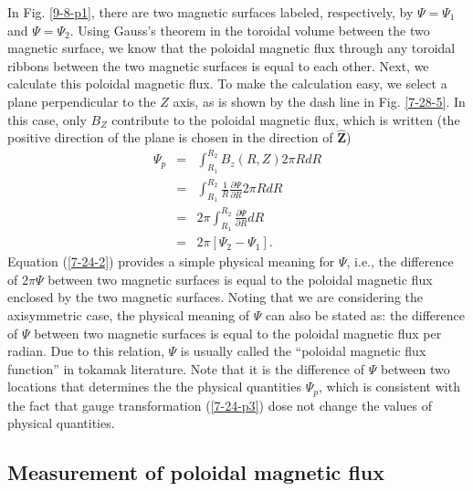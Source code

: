 \documentclass{llncs}
\begin{document}
In Fig. \ref{9-8-p1}, there are two magnetic surfaces labeled, respectively,
by $\Psi = \Psi_1$ and $\Psi = \Psi_2$. Using Gauss's theorem in the toroidal
volume between the two magnetic surface, we know that the poloidal magnetic
flux through any toroidal ribbons between the two magnetic surfaces is equal
to each other. Next, we calculate this poloidal magnetic flux. To make the
calculation easy, we select a plane perpendicular to the $Z$ axis, as is shown
by the dash line in Fig. \ref{7-28-5}. In this case, only $B_Z$ contribute to
the poloidal magnetic flux, which is written (the positive direction of the
plane is chosen in the direction of $\hat{\mathbf{Z}}$)
\begin{eqnarray}
  \Psi_p & = & \int_{R_1}^{R_2} B_z (R, Z) 2 \pi R d R \nonumber\\
  & = & \int_{R_1}^{R_2} \frac{1}{R}  \frac{\partial \Psi}{\partial R} 2 \pi
  R d R \nonumber\\
  & = & 2 \pi \int^{R_2}_{R_1} \frac{\partial \Psi}{\partial R} d R
  \nonumber\\
  & = & 2 \pi [\Psi_2 - \Psi_1] .  \label{7-24-2}
\end{eqnarray}
Equation (\ref{7-24-2}) provides a simple physical meaning for $\Psi$, i.e.,
the difference of $2 \pi \Psi$ between two magnetic surfaces is equal to the
poloidal magnetic flux enclosed by the two magnetic surfaces. Noting that we
are considering the axisymmetric case, the physical meaning of $\Psi$ can also
be stated as: the difference of $\Psi$ between two magnetic surfaces is equal
to the poloidal magnetic flux per radian. Due to this relation, $\Psi$ is
usually called the ``poloidal magnetic flux function'' in tokamak literature.
Note that it is the difference of $\Psi$ between two locations that determines
the the physical quantities $\Psi_p$, which is consistent with the fact that
gauge transformation (\ref{7-24-p3}) dose not change the values of physical
quantities.

\subsection{Measurement of poloidal magnetic flux}
\end{document}
